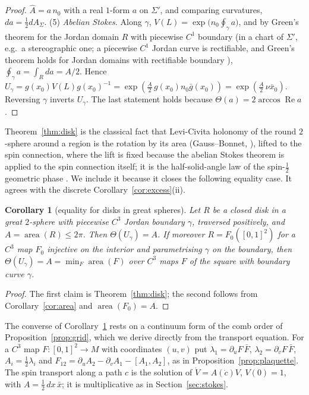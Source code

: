 \documentclass[11pt,reqno]{amsart}
\newtheorem{corollary}[theorem]{Corollary}
\theoremstyle{definition}
\theoremstyle{remark}
\numberwithin{equation}{section}
\newcommand{\re}{\operatorname{Re}}
\begin{document}
\begin{proof}
$\hat A=a\,n_0$ with a real $1$-form $a$ on $\Sigma'$, and comparing curvatures, $da=\tfrac12dA_\Sigma$.  (5) \emph{Abelian Stokes.}
Along $\gamma$, $V(L)=\exp\bigl(n_0\oint_\gamma a\bigr)$, and by Green's theorem for the Jordan domain $R$ with piecewise $C^1$ boundary
(in a chart of $\Sigma'$, e.g.\ a stereographic one; a piecewise $C^1$ Jordan curve is rectifiable, and Green's theorem holds for
Jordan domains with rectifiable boundary \cite{Potts51}), $\oint_\gamma a=\int_Rda=A/2$.  Hence
$U_\gamma=g(x_0)V(L)g(x_0)^{-1}=\exp(\tfrac A2\,g(x_0)n_0\bar g(x_0))=\exp(\tfrac A2\,\nu\bar x_0)$.  Reversing $\gamma$ inverts $U_\gamma$.  The
last statement holds because $\Theta(a)=2\arccos\re a$.
\end{proof}

Theorem~\ref{thm:disk} is the classical fact that Levi-Civita holonomy of the round $2$-sphere around a region is the
rotation by its area (Gauss--Bonnet, \cite[\S4-5]{doCarmo76}), lifted to the spin connection, where the lift is fixed
because the abelian Stokes theorem is applied to the spin connection itself; it is the half-solid-angle law of the
spin-$\tfrac12$ geometric phase \cite{SB88,MS93}.  We include it because it closes the following equality case.  It agrees
with the discrete Corollary~\ref{cor:excess}(ii).

\begin{corollary}[equality for disks in great spheres]\label{cor:convex}
Let $R$ be a closed disk in a great $2$-sphere with piecewise $C^3$ Jordan boundary $\gamma$, traversed positively, and
$A=\operatorname{area}(R)\le2\pi$.  Then $\Theta(U_\gamma)=A$.  If moreover $R=F_0([0,1]^2)$ for a $C^3$ map $F_0$ injective on the interior
and parametrising $\gamma$ on the boundary, then $\Theta(U_\gamma)=A=\min_F\operatorname{area}(F)$ over $C^3$ maps $F$ of the square with
boundary curve $\gamma$.
\end{corollary}
\begin{proof}
The first claim is Theorem~\ref{thm:disk}; the second follows from Corollary~\ref{cor:area} and $\operatorname{area}(F_0)=A$.
\end{proof}

The converse of Corollary~\ref{cor:convex} rests on a continuum form of the comb order of Proposition~\ref{prop:grid}, which we
derive directly from the transport equation.  For a $C^3$ map $F\colon[0,1]^2\to M$ with coordinates $(u,v)$ put $\lambda_1=\partial_uF\,\bar F$,
$\lambda_2=\partial_vF\,\bar F$, $A_i=\tfrac12\lambda_i$ and $F_{12}=\partial_uA_2-\partial_vA_1-[A_1,A_2]$, as in Proposition~\ref{prop:plaquette}.  The spin
transport along a path $c$ is the solution of $\dot V=A(\dot c)V$, $V(0)=1$, with $A=\tfrac12\,dx\,\bar x$; it is multiplicative as in
Section~\ref{sec:stokes}.
\end{document}
